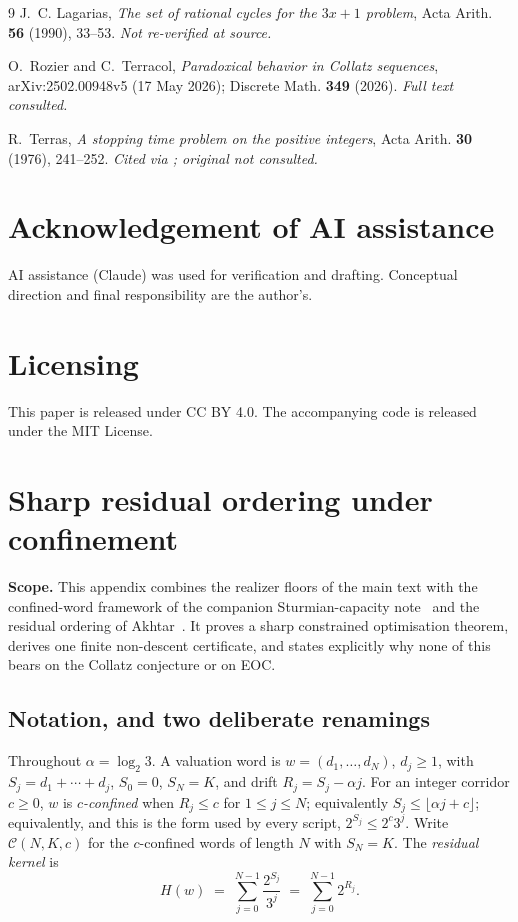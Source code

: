 \documentclass[11pt,a4paper]{article}
\theoremstyle{plain}
\theoremstyle{definition}
\newcommand{\Cc}{\mathcal{C}}
\newcommand{\al}{\alpha}
\begin{document}
\begin{thebibliography}{9}
J.~C. Lagarias, \emph{The set of rational cycles for the $3x+1$ problem},
Acta Arith. \textbf{56} (1990), 33--53. \emph{Not re-verified at source.}

O.~Rozier and C.~Terracol, \emph{Paradoxical behavior in Collatz sequences},
arXiv:2502.00948v5 (17 May 2026); Discrete Math. \textbf{349} (2026).
\emph{Full text consulted.}

R.~Terras, \emph{A stopping time problem on the positive integers}, Acta Arith.
\textbf{30} (1976), 241--252. \emph{Cited via \cite{lagarias2010};
original not consulted.}
\end{thebibliography}

\section*{Acknowledgement of AI assistance}

AI assistance (Claude) was used for verification and drafting. Conceptual
direction and final responsibility are the author's.

\section*{Licensing}

This paper is released under CC BY 4.0. The accompanying code is released under
the MIT License.


\appendix
\section{Sharp residual ordering under confinement}\label{app:E}

\noindent\textbf{Scope.} This appendix combines the realizer floors of the
main text with the confined-word framework of the companion Sturmian-capacity
note~\cite{E-sturmian} and the residual ordering of Akhtar~\cite{akhtar2026}.
It proves a sharp constrained optimisation theorem, derives one finite
non-descent certificate, and states explicitly why none of this bears on the
Collatz conjecture or on EOC.

\subsection{Notation, and two deliberate renamings}

Throughout $\al=\log_2 3$. A valuation word is $w=(d_1,\dots,d_N)$, $d_j\ge1$,
with $S_j=d_1+\cdots+d_j$, $S_0=0$, $S_N=K$, and drift $R_j=S_j-\al j$. For an
integer corridor $c\ge0$, $w$ is \emph{$c$-confined} when $R_j\le c$ for
$1\le j\le N$; equivalently $S_j\le\lfloor \al j+c\rfloor$; equivalently, and
this is the form used by every script, $2^{S_j}\le 2^{c}3^{j}$. Write
$\Cc(N,K,c)$ for the $c$-confined words of length $N$ with $S_N=K$. The
\emph{residual kernel} is
\[
H(w)\;=\;\sum_{j=0}^{N-1}\frac{2^{S_j}}{3^{j}}\;=\;\sum_{j=0}^{N-1}2^{R_j}.
\]
\end{document}
